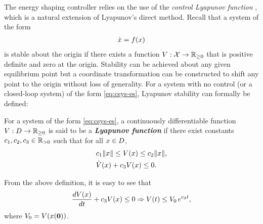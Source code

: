 The energy shaping controller relies on the use of the {\em control Lyapunov
  function} \cite{Artstein1983,Freeman1996}, which is a natural extension of
Lyapunov's direct method.
% 
Recall that a system of the form
\begin{align}
  \label{eq:csys-es}
  {\dot {x}} = f(x)
\end{align}
is stable about the origin if there exists a function $V : \mathcal{X} \to \mathbb{R}_{\geq 0}$ that is
positive definite and zero at the origin.
% 
Stability can be achieved about any given equilibrium point but a coordinate
transformation can be constructed to shift any point to the origin without loss
of generality.
% 
For a system with no control (or a closed-loop system) of the form
\eqref{eq:csys-es}, Lyapunov stability can formally be defined:
% 
\begin{definition}
  \label{def:lyap-func}
  For a system of the form \eqref{eq:csys-es}, a continuously differentiable
  function $V : D \to \mathbb{R}_{\geq 0}$ is said to be a {\bf \em Lyapunov function} if
  there exist constants $c_{1}, c_{2}, c_{3} \in \mathbb{R}_{> 0}$ such that for all
  $x \in D$,
  \begin{eqnarray*}
    &c_{1} \|x\| \leq V(x) \leq c_{2} \|x\|,\\
    &{\dot V}(x) + c_{3} V(x) \leq 0.
  \end{eqnarray*}
\end{definition}

From the above definition, it is easy to see that
\begin{align*}
  \frac{dV(x)}{dt} + c_{3} V(x) \leq 0 \Rightarrow V(t) \leq V_{0} \, e^{c_{3} t},
\end{align*}
where $V_{0} = V(x({\mathbf 0}))$.

